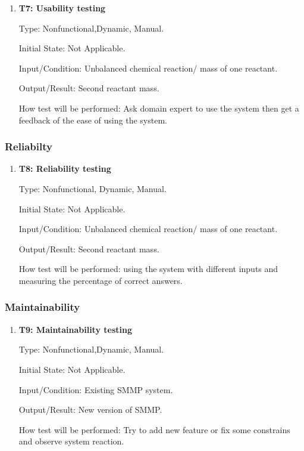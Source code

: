 \documentclass[12pt, titlepage]{article}
\begin{document}
\begin{enumerate}

\item{\bf T7: Usability testing\\}

Type: Nonfunctional,Dynamic, Manual.
					
Initial State: Not Applicable.
					
Input/Condition: Unbalanced chemical reaction/ mass of one reactant.
					
Output/Result: Second reactant mass.
					
How test will be performed: Ask domain expert to use the system then get a
feedback of the ease of using the system.
					
\end{enumerate}

\subsubsection{Reliabilty}

\begin{enumerate}

\item{\bf T8: Reliability testing\\}

Type: Nonfunctional, Dynamic, Manual.
					
Initial State: Not Applicable.
					
Input/Condition: Unbalanced chemical reaction/ mass of one reactant.
					
Output/Result: Second reactant mass.
					
How test will be performed: using the system with different inputs and measuring
the percentage of correct answers.

\end{enumerate}

\subsubsection{Maintainability}

\begin{enumerate}

\item{\bf T9: Maintainability testing\\}

Type: Nonfunctional,Dynamic, Manual.
					
Initial State: Not Applicable.
					
Input/Condition: Existing SMMP system.
					
Output/Result: New version of SMMP.
					
How test will be performed: Try to add new feature or fix some constrains and
observe system reaction.

\end{enumerate}
\end{document}
